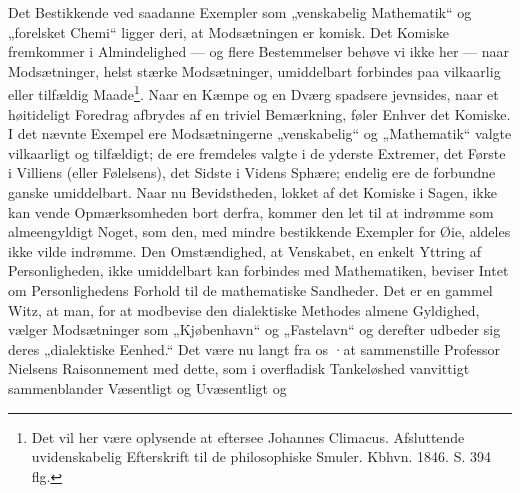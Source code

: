 \documentclass[12pt,a4paper]{book}
\newcommand{\opage}[1]{\marginnote{\footnotesize\textit{[#1]}}}
\begin{document}
Det Bestikkende ved saadanne Exempler som „venskabelig
Mathematik“ og „forelsket Chemi“ ligger deri,
at Modsætningen er komisk. Det Komiske fremkommer
i Almindelighed --- og flere Bestemmelser behøve vi ikke
her --- naar Modsætninger, helst stærke Modsætninger,
umiddelbart forbindes paa vilkaarlig eller tilfældig
Maade\footnote{Det vil her være oplysende at eftersee Johannes Climacus. Afsluttende uvidenskabelig Efterskrift til de philosophiske Smuler.
Kbhvn. 1846. S. 394 flg.}. Naar en Kæmpe og en Dværg spadsere
\opage{29}\setcounter{footnote}{0}%
jevnsides, naar et høitideligt Foredrag afbrydes af
en triviel Bemærkning, føler Enhver det Komiske.
I det nævnte Exempel ere Modsætningerne „venskabelig“
og „Mathematik“ valgte vilkaarligt og tilfældigt;
de ere fremdeles valgte i de yderste Extremer,
det Første i Villiens (eller Følelsens), det Sidste i Videns
Sphære; endelig ere de forbundne ganske umiddelbart.
Naar nu Bevidstheden, lokket af det Komiske i
Sagen, ikke kan vende Opmærksomheden bort derfra,
kommer den let til at indrømme som almeengyldigt
Noget, som den, med mindre bestikkende Exempler for
Øie, aldeles ikke vilde indrømme. Den Omstændighed,
at Venskabet, en enkelt Yttring af Personligheden, ikke
umiddelbart kan forbindes med Mathematiken, beviser Intet
om Personlighedens Forhold til de mathematiske Sandheder.
Det er en gammel Witz, at man, for at modbevise
den dialektiske Methodes almene Gyldighed, vælger
Modsætninger som „Kjøbenhavn“ og „Fastelavn“ og
derefter udbeder sig deres „dialektiske Eenhed.“ Det
være nu langt fra os ·at sammenstille Professor Nielsens
Raisonnement med dette, som i overfladisk Tankeløshed
vanvittigt sammenblander Væsentligt og Uvæsentligt og
\end{document}
